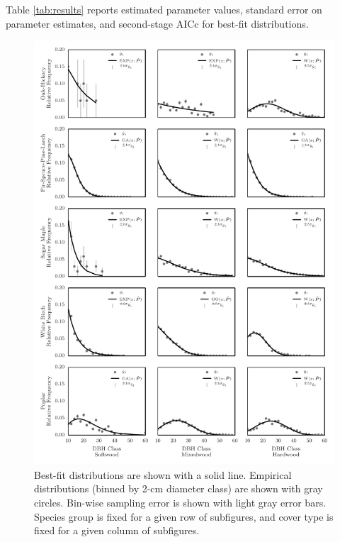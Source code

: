 \documentclass{article}
\begin{document}
Table \ref{tab:results} reports estimated parameter values, standard error on parameter estimates, and second-stage AICc for best-fit distributions. 


\begin{figure}[h!]
  \centering
  \includegraphics[width=1.0\textwidth]{images/pspdistfit_fitplot0}
  \caption{Best-fit distributions are shown with a solid
    line. Empirical distributions (binned by 2-cm
    diameter class) are shown with gray circles. Bin-wise sampling error is shown with light gray error bars. Species group is fixed for a given row of subfigures, and cover type is fixed for a given column of subfigures.}
  \label{fig:results1}
\end{figure}
\end{document}
